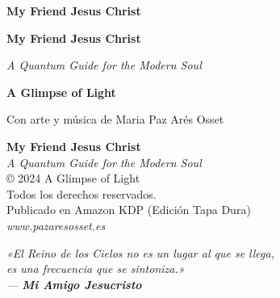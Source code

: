 \documentclass[12pt,twoside,openright]{book}
\begin{document}
\frontmatter

\thispagestyle{empty}
\vspace*{5cm}
\begin{center}
    {\LARGE \textbf{My Friend Jesus Christ}}
\end{center}
\cleardoublepage

\begin{titlepage}
    \centering
    \vspace*{2cm}
    {\Huge \textbf{My Friend Jesus Christ} \par}
    \vspace{0.8cm}
    {\Large \textit{A Quantum Guide for the Modern Soul} \par}
    \vfill
    {\large \textbf{A Glimpse of Light} \par}
    \vspace{0.5cm}
    {\small Con arte y música de Maria Paz Arés Osset \par}
    \vspace*{2cm}
\end{titlepage}
\cleardoublepage

\thispagestyle{empty}
\vspace*{11cm}
\begin{center}
    \small
    \textbf{My Friend Jesus Christ} \\
    \textit{A Quantum Guide for the Modern Soul} \\
    \vspace{0.5cm}
    © 2024 A Glimpse of Light \\
    Todos los derechos reservados. \\
    Publicado en Amazon KDP (Edición Tapa Dura) \\
    \vspace{0.3cm}
    \textit{www.pazaresosset.es}
\end{center}
\cleardoublepage

\thispagestyle{empty}
\vspace*{6cm}
\begin{center}
    \itshape
    «El Reino de los Cielos no es un lugar al que se llega,\\
    es una frecuencia que se sintoniza.»\\
    \vspace{1cm}
    \normalfont --- \textbf{Mi Amigo Jesucristo}
\end{center}
\cleardoublepage
\end{document}
